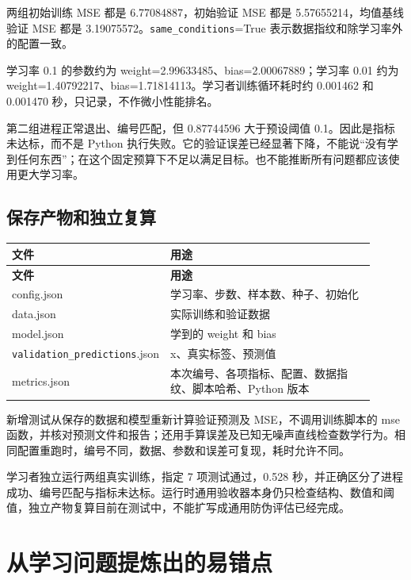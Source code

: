 \documentclass[UTF8,zihao=-4,fontset=fandol]{ctexart}
\begin{document}
两组初始训练 MSE 都是 6.77084887，初始验证 MSE 都是 5.57655214，均值基线验证 MSE 都是 3.19075572。\nolinkurl{same_conditions}=True 表示数据指纹和除学习率外的配置一致。

学习率 0.1 的参数约为 weight=2.99633485、bias=2.00067889；学习率 0.01 约为 weight=1.40792217、bias=1.71814113。学习者训练循环耗时约 0.001462 和 0.001470 秒，只记录，不作微小性能排名。

第二组进程正常退出、编号匹配，但 0.87744596 大于预设阈值 0.1。因此是指标未达标，而不是 Python 执行失败。它的验证误差已经显著下降，不能说“没有学到任何东西”；在这个固定预算下不足以满足目标。也不能推断所有问题都应该使用更大学习率。

\subsection{保存产物和独立复算}

{\small\setlength{\tabcolsep}{4pt}
\renewcommand{\arraystretch}{1.25}
\begin{longtable}{>{\raggedright\arraybackslash}p{0.28\linewidth}>{\raggedright\arraybackslash}p{0.63\linewidth}}
\toprule
\textbf{文件} & \textbf{用途} \\
\midrule\endfirsthead
\toprule
\textbf{文件} & \textbf{用途} \\
\midrule\endhead
\bottomrule\endfoot
config.json & 学习率、步数、样本数、种子、初始化 \\
data.json & 实际训练和验证数据 \\
model.json & 学到的 weight 和 bias \\
\nolinkurl{validation_predictions}.json & x、真实标签、预测值 \\
metrics.json & 本次编号、各项指标、配置、数据指纹、脚本哈希、Python 版本 \\
\end{longtable}}

新增测试从保存的数据和模型重新计算验证预测及 MSE，不调用训练脚本的 mse 函数，并核对预测文件和报告；还用手算误差及已知无噪声直线检查数学行为。相同配置重跑时，编号不同，数据、参数和误差可复现，耗时允许不同。

学习者独立运行两组真实训练，指定 7 项测试通过，0.528 秒，并正确区分了进程成功、编号匹配与指标未达标。运行时通用验收器本身仍只检查结构、数值和阈值，独立产物复算目前在测试中，不能扩写成通用防伪评估已经完成。

\section{从学习问题提炼出的易错点}
\end{document}
